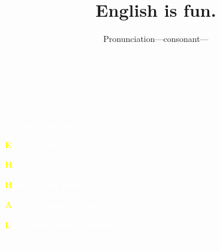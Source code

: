 \documentclass[aspectratio=169, xcolor={dvipsnames,table}]{beamer}
\title{English is fun.}
\subtitle{Pronunciation---consonant---}
\author{}
\institute[]{}
\date[]
\makeatletter
\newcommand*{\themonth}{\two@digits\month}
\newcommand*{\theday}{\two@digits\day}
\newcommand{\mytoday}{{\the\year}--{\themonth}--{\theday}}
\makeatother
\begin{document}
\begin{frame}
  \raggedleft \textcolor{white}{\Huge\bfseries English is fun.}

  \vfill

  \raggedleft
  \textcolor{white}{\LARGE\bfseries \mytoday}

  \vfill
  \vfill
  \vfill

  \raggedleft
  \textcolor{white}{\Huge\bfseries Stream Starting Soon}


  \hyperlink{today}{}
\end{frame}

\begin{frame}
  \raggedleft \textcolor{white}{\Huge\bfseries \textcolor{yellow}{E}nglish is fun.}

  \vfill

  \vfill

  \raggedleft \textcolor{white}{\LARGE\bfseries \textcolor{yellow}{H}ello, everybody!}

  \textcolor{white}{\LARGE\bfseries \textcolor{yellow}{H}ow are you today?}

  \raggedleft \textcolor{white}{\LARGE\bfseries \textcolor{yellow}{A}re you ready to start?}

  \textcolor{white}{\LARGE\bfseries \textcolor{yellow}{L}et's begin today's lesson.}

  \vfill

  \raggedleft
  \textcolor{white}{\Large \bfseries \mytoday}


\end{frame}
\end{document}
